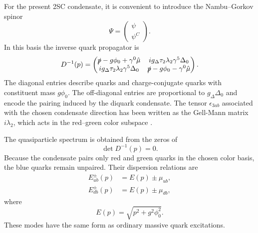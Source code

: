 For the present 2SC condensate, it is convenient to introduce the
Nambu--Gorkov spinor
\begin{equation}
\Psi =
\begin{pmatrix}
\psi \\
\psi^C
\end{pmatrix}.
\label{eq:qmd_nambu_gorkov_spinor}
\end{equation}
In this basis the inverse quark propagator is
\begin{equation}
D^{-1}(p)
=
\begin{pmatrix}
\slashed{p}-g\phi_0+\gamma^0\hat{\mu}
&
i g_\Delta \tau_2\lambda_2\gamma^5\Delta_0
\\
i g_\Delta \tau_2\lambda_2\gamma^5\Delta_0
&
\slashed{p}-g\phi_0-\gamma^0\hat{\mu}
\end{pmatrix}.
\label{eq:qmd_inverse_propagator}
\end{equation}
The diagonal entries describe quarks and charge-conjugate quarks with
constituent mass \(g\phi_0\). The off-diagonal entries are proportional to
\(g_\Delta\Delta_0\) and encode the pairing induced by the diquark
condensate. The tensor \(\epsilon_{3ab}\) associated with the chosen
condensate direction has been written as the Gell-Mann matrix
\(i\lambda_2\), which acts in the red--green color subspace
\cite{Andersen2024}.

The quasiparticle spectrum is obtained from the zeros of
\begin{equation}
\det D^{-1}(p)=0 .
\end{equation}
Because the condensate pairs only red and green quarks in the chosen color
basis, the blue quarks remain unpaired. Their dispersion relations are
\begin{align}
E_{ub}^{\pm}(p) &= E(p)\pm\mu_{ub}, \\
E_{db}^{\pm}(p) &= E(p)\pm\mu_{db},
\end{align}
where
\begin{equation}
E(p)=\sqrt{p^2+g^2\phi_0^2}.
\end{equation}
These modes have the same form as ordinary massive quark excitations.

